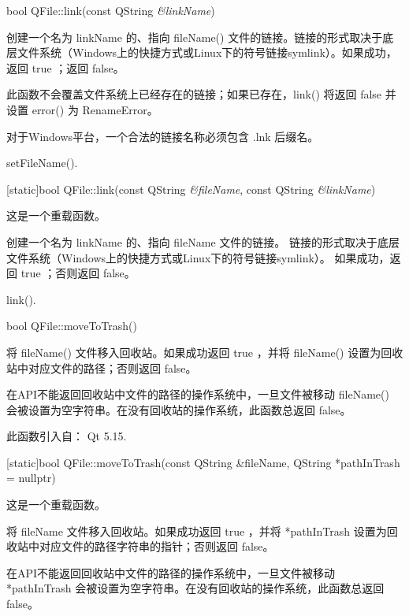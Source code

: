 bool QFile::link(const QString \emph{\&linkName})

创建一个名为 linkName 的、指向 fileName() 文件的链接。链接的形式取决于底层文件系统（Windows上的快捷方式或Linux下的符号链接symlink）。如果成功，返回 true ；返回 false。

此函数不会覆盖文件系统上已经存在的链接；如果已存在，link() 将返回 false 并设置 error() 为 RenameError。


\begin{notice}
对于Windows平台，一个合法的链接名称必须包含 .lnk 后缀名。
\end{notice} 


\begin{seeAlso}
setFileName().
\end{seeAlso} 

[static]bool QFile::link(const QString \emph{\&fileName}, const QString \emph{\&linkName})

这是一个重载函数。

创建一个名为 linkName 的、指向 fileName 文件的链接。
链接的形式取决于底层文件系统（Windows上的快捷方式或Linux下的符号链接symlink）。
如果成功，返回 true ；否则返回 false。

\begin{seeAlso}
link().
\end{seeAlso} 

bool QFile::moveToTrash()

将 fileName() 文件移入回收站。如果成功返回 true ，并将 fileName() 设置为回收站中对应文件的路径；否则返回 false。
 

\begin{notice}
在API不能返回回收站中文件的路径的操作系统中，一旦文件被移动 fileName() 会被设置为空字符串。在没有回收站的操作系统，此函数总返回 false。
\end{notice} 

此函数引入自： Qt 5.15.

[static]bool QFile::moveToTrash(const QString \&fileName, QString *pathInTrash = nullptr)

这是一个重载函数。

将 fileName 文件移入回收站。如果成功返回 true ，并将 *pathInTrash 设置为回收站中对应文件的路径字符串的指针；否则返回 false。

\begin{notice}
在API不能返回回收站中文件的路径的操作系统中，一旦文件被移动 *pathInTrash 会被设置为空字符串。在没有回收站的操作系统，此函数总返回 false。
\end{notice} 

